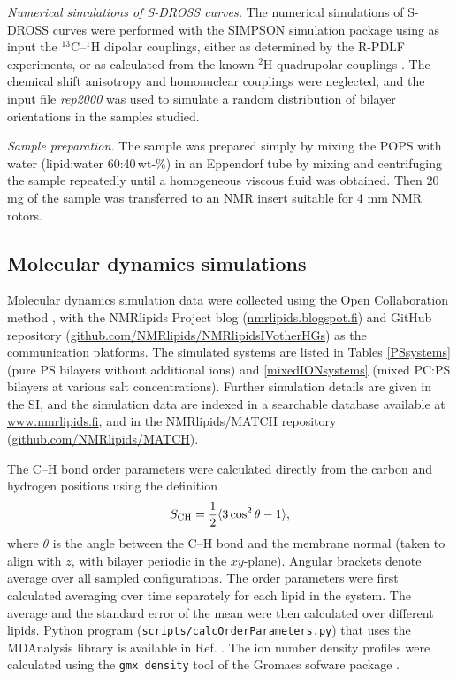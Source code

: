 \documentclass[aps,prl,superscriptaddress,twocolumn]{revtex4}
\begin{document}
\emph{Numerical simulations of S-DROSS curves.}
The numerical simulations of S-DROSS curves were performed with the SIMPSON simulation package \cite{bak00}
using as input the $^{13}$C--$^1$H
dipolar couplings, either as determined by the R-PDLF experiments, or as calculated from the known $^2$H quadrupolar couplings \cite{browning80}.
The chemical shift anisotropy and homonuclear couplings were neglected, and the input file {\it{rep2000}} was used to simulate a random
distribution of bilayer orientations in the samples studied.

\emph{Sample preparation.}
The sample was prepared simply by mixing the POPS  with water (lipid:water 60:40\,wt-\%) in an Eppendorf
tube by mixing and centrifuging the sample repeatedly until a  homogeneous viscous fluid was obtained.
Then 20 mg of the sample was  transferred to an NMR insert suitable for 4 mm NMR rotors.  


\subsection{Molecular dynamics simulations}
Molecular dynamics simulation data were collected using
the Open Collaboration method \cite{botan15}, with
the NMR\-lipids Project blog (\url{nmrlipids.blogspot.fi}) and
GitHub repository (\url{github.com/NMRlipids/NMRlipidsIVotherHGs})
as the communication platforms.
The simulated systems are listed in 
Tables \ref{PSsystems} (pure PS bilayers without additional ions) 
and \ref{mixedIONsystems} (mixed PC:PS bilayers at various salt concentrations).
Further simulation details are given in the SI, and
the simulation data are indexed in a
searchable database available at \url{www.nmrlipids.fi},
and in the NMRlipids/MATCH repository (\url{github.com/NMRlipids/MATCH}).

The C--H bond order parameters were calculated directly
from the carbon and hydrogen positions using the definition
\begin{equation}
S_{\rm CH}=\frac{1}{2}\langle 3\cos^2\theta -1 \rangle,
\end{equation}
where $\theta$ is the angle between the C--H bond and the membrane normal
(taken to align with $z$, with bilayer periodic in the $xy$-plane).
Angular brackets denote average over all sampled configurations.
The order parameters were first calculated averaging over time separately
for each lipid in the system. The average and
the standard error of the mean were then calculated over different lipids.
Python program ({\tt scripts/calcOrderParameters.py}) that uses the
MDAnalysis library \cite{agrawal11,gowers16} is available in Ref. . 
The ion  number density profiles were calculated using the {\tt gmx density} tool
of the Gromacs sofware package \cite{gromacsMANUAL}.
\end{document}
